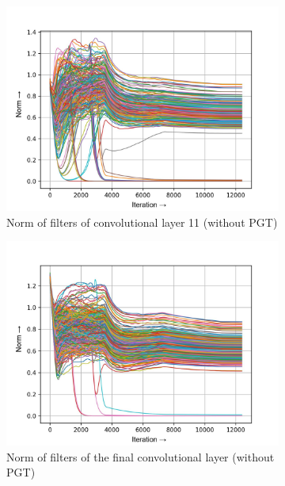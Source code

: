 \documentclass[times,sort&compress]{elsarticle}
\begin{document}
\begin{figure}[t]
\centering
\captionsetup{font=scriptsize}

\begin{subfigure}[t]{0.32\textwidth}
\includegraphics[width=\linewidth]{baseline-w-layer-4-2}
\caption{Norm of filters of convolutional layer 11 (without PGT)}
\end{subfigure}
\begin{subfigure}[t]{0.32\textwidth}
\includegraphics[width=\linewidth]{baseline-w-layer-7-2}
\caption{Norm of filters of the final convolutional layer (without PGT)}
\end{subfigure}
\begin{subfigure}[t]{0.32\textwidth}

\end{subfigure}
\end{figure}
\end{document}
